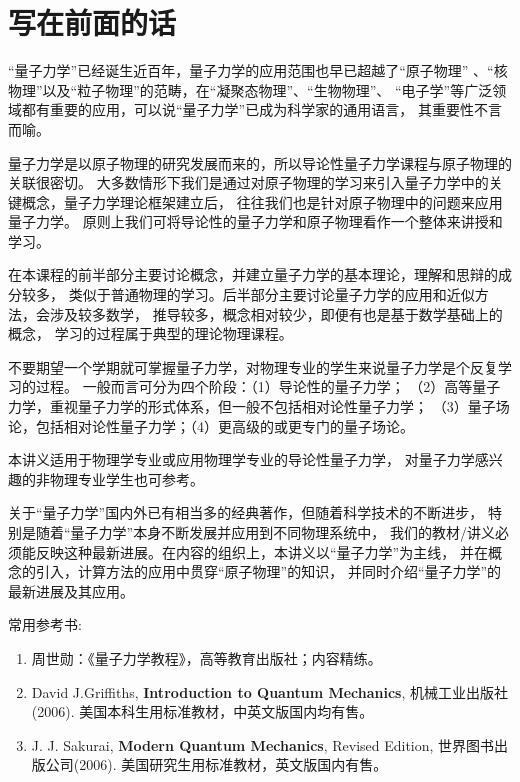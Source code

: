 \chapter*{写在前面的话}

\qquad ``量子力学''已经诞生近百年，量子力学的应用范围也早已超越了``原子物理''
、``核物理''以及``粒子物理''的范畴，在``凝聚态物理''、``生物物理''、
``电子学''等广泛领域都有重要的应用，可以说``量子力学''已成为科学家的通用语言，
其重要性不言而喻。

量子力学是以原子物理的研究发展而来的，所以导论性量子力学课程与原子物理的关联很密切。
大多数情形下我们是通过对原子物理的学习来引入量子力学中的关键概念，量子力学理论框架建立后，
往往我们也是针对原子物理中的问题来应用量子力学。
原则上我们可将导论性的量子力学和原子物理看作一个整体来讲授和学习。

在本课程的前半部分主要讨论概念，并建立量子力学的基本理论，理解和思辩的成分较多，
类似于普通物理的学习。后半部分主要讨论量子力学的应用和近似方法，会涉及较多数学，
推导较多，概念相对较少，即便有也是基于数学基础上的概念，
学习的过程属于典型的理论物理课程。

不要期望一个学期就可掌握量子力学，对物理专业的学生来说量子力学是个反复学习的过程。
一般而言可分为四个阶段：（1）导论性的量子力学；
（2）高等量子力学，重视量子力学的形式体系，但一般不包括相对论性量子力学；
（3）量子场论，包括相对论性量子力学；（4）更高级的或更专门的量子场论。

本讲义适用于物理学专业或应用物理学专业的导论性量子力学，
对量子力学感兴趣的非物理专业学生也可参考。


关于``量子力学''国内外已有相当多的经典著作，但随着科学技术的不断进步，
特别是随着``量子力学''本身不断发展并应用到不同物理系统中，
我们的教材/讲义必须能反映这种最新进展。在内容的组织上，本讲义以``量子力学''为主线，
并在概念的引入，计算方法的应用中贯穿``原子物理''的知识，
并同时介绍``量子力学''的最新进展及其应用。

常用参考书:

\begin{enumerate}

\item{周世勋：《量子力学教程》，高等教育出版社；内容精练。}

\item{David J.Griffiths, \textbf{Introduction to Quantum Mechanics}, 机械工业出版社(2006).
美国本科生用标准教材，中英文版国内均有售。}

\item{J. J. Sakurai, \textbf{Modern Quantum Mechanics}, Revised Edition,
世界图书出版公司(2006). 美国研究生用标准教材，英文版国内有售。}
\end{enumerate}


